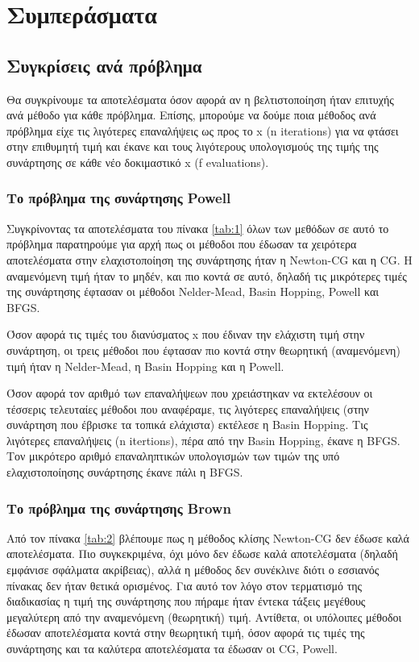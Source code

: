 \documentclass[a4paper,12pt,twoside]{report}
\theoremstyle{plain}
\theoremstyle{definition}
\theoremstyle{remark}
\begin{document}
\chapter{Συμπεράσματα}

\section{Συγκρίσεις ανά πρόβλημα}

Θα συγκρίνουμε τα αποτελέσματα όσον αφορά αν η βελτιστοποίηση ήταν επιτυχής ανά μέθοδο για κάθε πρόβλημα. Επίσης, μπορούμε να δούμε ποια μέθοδος ανά πρόβλημα είχε τις λιγότερες επαναλήψεις ως προς το x (n iterations) για να φτάσει στην επιθυμητή τιμή και έκανε και τους λιγότερους υπολογισμούς της τιμής της συνάρτησης σε κάθε νέο δοκιμαστικό x (f evaluations).

\subsection{Το πρόβλημα της συνάρτησης Powell}

Συγκρίνοντας τα αποτελέσματα του πίνακα \ref{tab:1} όλων των μεθόδων σε αυτό το πρόβλημα παρατηρούμε για αρχή πως οι μέθοδοι που έδωσαν τα χειρότερα αποτελέσματα στην ελαχιστοποίηση της συνάρτησης ήταν η Newton-CG και η CG. Η αναμενόμενη τιμή ήταν το μηδέν, και πιο κοντά σε αυτό, δηλαδή τις μικρότερες τιμές της συνάρτησης έφτασαν οι μέθοδοι Nelder-Mead, Basin Hopping, Powell και BFGS.

Όσον αφορά τις τιμές του διανύσματος x που έδιναν την ελάχιστη τιμή στην συνάρτηση, οι τρεις μέθοδοι που έφτασαν πιο κοντά στην θεωρητική (αναμενόμενη) τιμή ήταν η Nelder-Mead, η Basin Hopping και η Powell.

Όσον αφορά τον αριθμό των επαναλήψεων που χρειάστηκαν να εκτελέσουν οι τέσσερις τελευταίες μέθοδοι που αναφέραμε, τις λιγότερες επαναλήψεις (στην συνάρτηση που έβρισκε τα τοπικά ελάχιστα) εκτέλεσε η Basin Hopping. Τις λιγότερες επαναλήψεις (n itertions), πέρα από την Basin Hopping, έκανε η BFGS. Τον μικρότερο αριθμό επαναληπτικών υπολογισμών των τιμών της υπό ελαχιστοποίησης συνάρτησης έκανε πάλι η BFGS.

\subsection{Το πρόβλημα της συνάρτησης Brown}

Από τον πίνακα \ref{tab:2} βλέπουμε πως η μέθοδος κλίσης Newton-CG δεν έδωσε καλά αποτελέσματα. Πιο συγκεκριμένα, όχι μόνο δεν έδωσε καλά αποτελέσματα (δηλαδή εμφάνισε σφάλματα ακρίβειας), αλλά η μέθοδος δεν συνέκλινε διότι ο εσσιανός πίνακας δεν ήταν θετικά ορισμένος. Για αυτό τον λόγο στον τερματισμό της διαδικασίας η τιμή της συνάρτησης που πήραμε ήταν έντεκα τάξεις μεγέθους μεγαλύτερη από την αναμενόμενη (θεωρητική) τιμή. Αντίθετα, οι υπόλοιπες μέθοδοι έδωσαν αποτελέσματα κοντά στην θεωρητική τιμή, όσον αφορά τις τιμές της συνάρτησης και τα καλύτερα αποτελέσματα τα έδωσαν οι CG, Powell.
\end{document}
